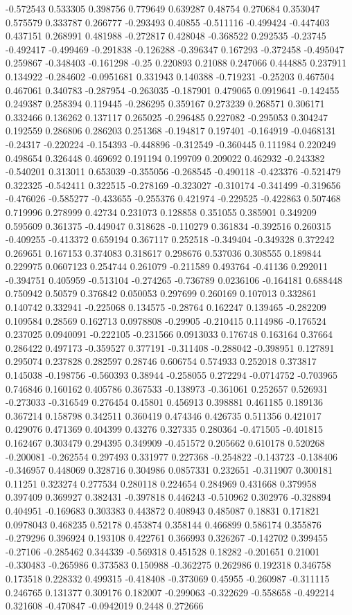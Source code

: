-0.572543 0.533305 0.398756 0.779649 0.639287 0.48754 0.270684 0.353047 0.575579 0.333787 0.266777 -0.293493 0.40855 -0.511116 -0.499424 -0.447403 0.437151 0.268991 0.481988 -0.272817 0.428048 -0.368522 0.292535 -0.23745 -0.492417 -0.499469 -0.291838 -0.126288 -0.396347 0.167293 -0.372458 -0.495047 0.259867 -0.348403 -0.161298 -0.25 0.220893 0.21088 0.247066 0.444885 0.237911 0.134922 -0.284602 -0.0951681 0.331943 0.140388 -0.719231 -0.25203 0.467504 0.467061 0.340783 -0.287954 -0.263035 -0.187901 0.479065 0.0919641 -0.142455 0.249387 0.258394 0.119445 -0.286295 0.359167 0.273239 0.268571 0.306171 0.332466 0.136262 0.137117 0.265025 -0.296485 0.227082 -0.295053 0.304247 0.192559 0.286806 0.286203 0.251368 -0.194817 0.197401 -0.164919 -0.0468131 -0.24317 -0.220224 -0.154393 -0.448896 -0.312549 -0.360445 0.111984 0.220249 0.498654 0.326448 0.469692 0.191194 0.199709 0.209022 0.462932 -0.243382 -0.540201 0.313011 0.653039 -0.355056 -0.268545 -0.490118 -0.423376 -0.521479 0.322325 -0.542411 0.322515 -0.278169 -0.323027 -0.310174 -0.341499 -0.319656 -0.476026 -0.585277 -0.433655 -0.255376 0.421974 -0.229525 -0.422863 0.507468 0.719996 0.278999 0.42734 0.231073 0.128858 0.351055 0.385901 0.349209 0.595609 0.361375 -0.449047 0.318628 -0.110279 0.361834 -0.392516 0.260315 -0.409255 -0.413372 0.659194 0.367117 0.252518 -0.349404 -0.349328 0.372242 0.269651 0.167153 0.374083 0.318617 0.298676 0.537036 0.308555 0.189844 0.229975 0.0607123 0.254744 0.261079 -0.211589 0.493764 -0.41136 0.292011 -0.394751 0.405959 -0.513104 -0.274265 -0.736789 0.0236106 -0.164181 0.688448 0.750942 0.50579 0.376842 0.050053 0.297699 0.260169 0.107013 0.332861 0.140742 0.332941 -0.225068 0.134575 -0.28764 0.162247 0.139465 -0.282209 0.109584 0.28569 0.162713 0.0978808 -0.29905 -0.210415 0.114986 -0.176524 0.237025 0.0940091 -0.222105 -0.231566 0.0913033 0.176748 0.163164 0.37664 0.286422 0.497173 -0.359527 0.377191 -0.311408 -0.288042 -0.398951 0.127891 0.295074 0.237828 0.282597 0.28746 0.606754 0.574933 0.252018 0.373817 0.145038 -0.198756 -0.560393 0.38944 -0.258055 0.272294 -0.0714752 -0.703965 0.746846 0.160162 0.405786 0.367533 -0.138973 -0.361061 0.252657 0.526931 -0.273033 -0.316549 0.276454 0.45801 0.456913 0.398881 0.461185 0.189136 0.367214 0.158798 0.342511 0.360419 0.474346 0.426735 0.511356 0.421017 0.429076 0.471369 0.404399 0.43276 0.327335 0.280364 -0.471505 -0.401815 0.162467 0.303479 0.294395 0.349909 -0.451572 0.205662 0.610178 0.520268 -0.200081 -0.262554 0.297493 0.331977 0.227368 -0.254822 -0.143723 -0.138406 -0.346957 0.448069 0.328716 0.304986 0.0857331 0.232651 -0.311907 0.300181 0.11251 0.323274 0.277534 0.280118 0.224654 0.284969 0.431668 0.379958 0.397409 0.369927 0.382431 -0.397818 0.446243 -0.510962 0.302976 -0.328894 0.404951 -0.169683 0.303383 0.443872 0.408943 0.485087 0.18831 0.171821 0.0978043 0.468235 0.52178 0.453874 0.358144 0.466899 0.586174 0.355876 -0.279296 0.396924 0.193108 0.422761 0.366993 0.326267 -0.142702 0.399455 -0.27106 -0.285462 0.344339 -0.569318 0.451528 0.18282 -0.201651 0.21001 -0.330483 -0.265986 0.373583 0.150988 -0.362275 0.262986 0.192318 0.346758 0.173518 0.228332 0.499315 -0.418408 -0.373069 0.45955 -0.260987 -0.311115 0.246765 0.131377 0.309176 0.182007 -0.299063 -0.322629 -0.558658 -0.492214 0.321608 -0.470847 -0.0942019 0.2448 0.272666 